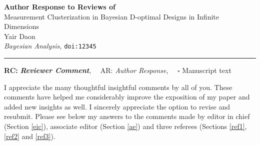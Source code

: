 \documentclass{article}
\def\papertitle{Measurement Clusterization in Bayesian D-optimal Designs in Infinite Dimensions}
\def\authors{Yair Daon}
\def\journal{Bayesian Analysis}
\def\doi{12345}
\providecommand{\lettertitle}{Author Response to Reviews of}
\providecommand{\papertitle}{Title}
\providecommand{\authors}{Authors}
\providecommand{\journal}{Journal}
\providecommand{\doi}{--}
\begin{document}
{\Large\bf \lettertitle}\\[1em]
{\huge \papertitle}\\[1em]
{\authors}\\
{\it \journal, }\texttt{doi:\doi}\\
\hrule

\hfill {\bfseries RC:} \textbf{\textit{Reviewer Comment}},\(\quad\) AR: \emph{Author Response}, \(\quad\square\) Manuscript text

I appreciate the many thoughtful insightful comments by all of
you. These comments have helped me considerably improve the exposition
of my paper and added new insights as well. I sincerely appreciate the
option to revise and resubmit. Please see below my answers to the
comments made by editor in chief (Section \ref{eic}), associate editor
(Section \ref{ae}) and three referees (Sections \ref{ref1}, \ref{ref2}
and \ref{ref3}).




    
   
    


   
    

    
    
\end{document}
